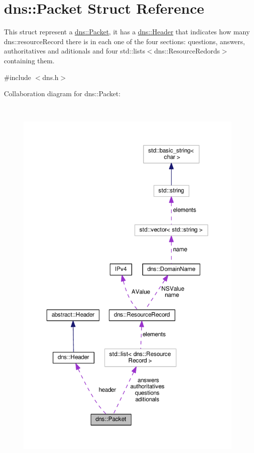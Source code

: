 \hypertarget{structdns_1_1Packet}{}\section{dns\+:\+:Packet Struct Reference}
\label{structdns_1_1Packet}


This struct represent a \hyperlink{structdns_1_1Packet}{dns\+::\+Packet}, it has a \hyperlink{structdns_1_1Header}{dns\+::\+Header} that indicates how many dns\+::resource\+Record there is in each one of the four sections\+: questions, answers, authoritatives and aditionals and four std\+::lists$<$dns\+::\+Resource\+Redords$>$ containing them.  




{\ttfamily \#include $<$dns.\+h$>$}



Collaboration diagram for dns\+:\+:Packet\+:\nopagebreak
\begin{figure}[H]
\begin{center}
\leavevmode
\includegraphics[height=550pt]{structdns_1_1Packet__coll__graph}
\end{center}
\end{figure}
